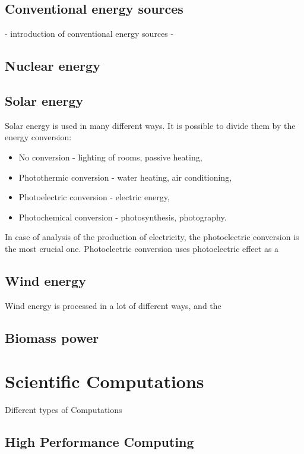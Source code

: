 \subsection{Conventional energy sources}

- introduction of conventional energy sources
- 

\subsection{Nuclear energy}

\subsection{Solar energy}

Solar energy is used in many different ways. It is possible to divide them by the energy conversion:

\begin{itemize}
    \item No conversion - lighting of rooms, passive heating,
    \item Photothermic conversion - water heating, air conditioning,
    \item Photoelectric conversion - electric energy,
    \item Photochemical conversion - photosynthesis, photography.
\end{itemize}

In case of analysis of the production of electricity, the photoelectric conversion is the most crucial one.
Photoelectric conversion uses photoelectric effect as a 

\subsection{Wind energy}

Wind energy is processed in a lot of different ways, and the 

\subsection{Biomass power}

\section{Scientific Computations}

Different types of Computations

\subsection{High Performance Computing}

